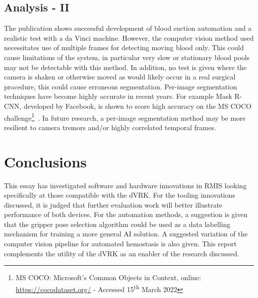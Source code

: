 \documentclass[english]{sobraep}
\begin{document}
\subsection{Analysis - II}
The publication shows successful development of blood suction automation and a realistic test with a da Vinci machine. However, the computer vision method used necessitates use of multiple frames for detecting moving blood only. This could cause limitations of the system, in particular very slow or stationary blood pools may not be detectable with this method. In addition, no test is given where the camera is shaken or otherwise moved as would likely occur in a real surgical procedure, this could cause erroneous segmentation. Per-image segmentation techniques have become highly accurate in recent years. For example Mask R-CNN, developed by Facebook, is shown to score high accuracy on the MS COCO challenge\footnote{MS COCO: Microsoft's Common Objects in Context, online: \url{https://cocodataset.org/} - Accessed 15\textsuperscript{th} March 2022}~\cite{mask-rcnn}. In future research, a per-image segmentation method may be more resilient to camera tremors and/or highly correlated temporal frames. 


\section{Conclusions}
This essay has investigated software and hardware innovations in RMIS looking specifically at those compatible with the dVRK. For the tooling innovations discussed, it is judged that further evaluation work will better illustrate performance of both devices. For the automation methods, a suggestion is given that the gripper pose selection algorithm could be used as a data labelling mechanism for training a more general AI solution. A suggested variation of the computer vision pipeline for automated hemostasis is also given. This report complements the utility of the dVRK as an enabler of the research discussed.
\printbibliography
\end{document}
